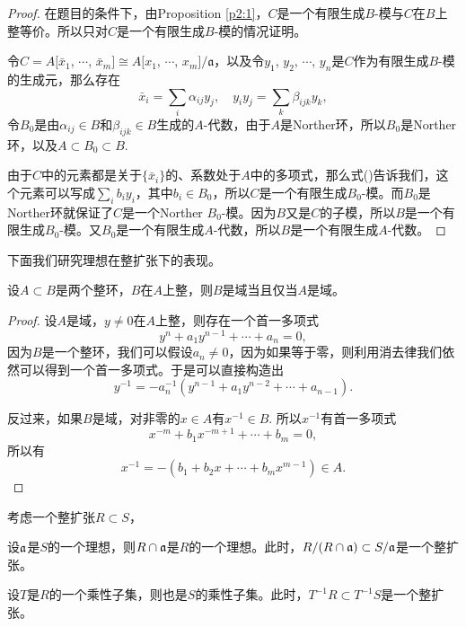 \begin{proof} 
	在题目的条件下，由Proposition \ref{p2:1}，$C$是一个有限生成$B$-模与$C$在$B$上整等价。所以只对$C$是一个有限生成$B$-模的情况证明。

	令$C=A[\bar{x}_1$, $\cdots$, $\bar{x}_m]\cong A[x_1$, $\cdots$, $x_m]/\mathfrak{a}$，以及令$y_1$, $y_2$, $\cdots$, $y_n$是$C$作为有限生成$B$-模的生成元，那么存在
	\begin{equation}
		\bar{x}_i=\sum_i\alpha_{ij}y_j,\quad y_iy_j=\sum_{k}\beta_{ijk}y_k,
	\end{equation}
	令$B_0$是由$\alpha_{ij}\in B$和$\beta_{ijk}\in B$生成的$A$-代数，由于$A$是Norther环，所以$B_0$是Norther环，以及$A\subset B_0 \subset B$.

	由于$C$中的元素都是关于$\{\bar{x}_i\}$的、系数处于$A$中的多项式，那么式(\theequation)告诉我们，这个元素可以写成$\sum_i b_i y_i$，其中$b_i\in B_0$，所以$C$是一个有限生成$B_0$-模。而$B_0$是Norther环就保证了$C$是一个Norther $B_0$-模。因为$B$又是$C$的子模，所以$B$是一个有限生成$B_0$-模。又$B_0$是一个有限生成$A$-代数，所以$B$是一个有限生成$A$-代数。
\end{proof}

下面我们研究理想在整扩张下的表现。

\begin{pro}
    \label{intfield} 设$A\subset B$是两个整环，$B$在$A$上整，则$B$是域当且仅当$A$是域。
\end{pro}

\begin{proof}
    设$A$是域，$y\neq 0$在$A$上整，则存在一个首一多项式
    \[
        y^n+a_1y^{n-1}+\cdots+a_n=0,
    \]
    因为$B$是一个整环，我们可以假设$a_n\neq 0$，因为如果等于零，则利用消去律我们依然可以得到一个首一多项式。于是可以直接构造出
    \[
        y^{-1}=-a_n^{-1}(y^{n-1}+a_1y^{n-2}+\cdots+a_{n-1}).
    \]

    反过来，如果$B$是域，对非零的$x\in A$有$x^{-1}\in B$. 所以$x^{-1}$有首一多项式
    \[
        x^{-m}+b_1x^{-m+1}+\cdots+b_m=0,
    \]
    所以有
    \[
        x^{-1}=-(b_1+b_2x+\cdots+b_mx^{m-1})\in A.
    \]
\end{proof}

\begin{lem}考虑一个整扩张$R\subset S$，
    \begin{compactenum}[~~~(1)]
        \item 设$\mathfrak{a}$是$S$的一个理想，则$R\cap \mathfrak{a}$是$R$的一个理想。此时，$R/(R\cap \mathfrak{a})\subset S/\mathfrak{a}$是一个整扩张。
        \item 设$T$是$R$的一个乘性子集，则也是$S$的乘性子集。此时，$T^{-1}R\subset T^{-1}S$是一个整扩张。
    \end{compactenum}
\end{lem}

